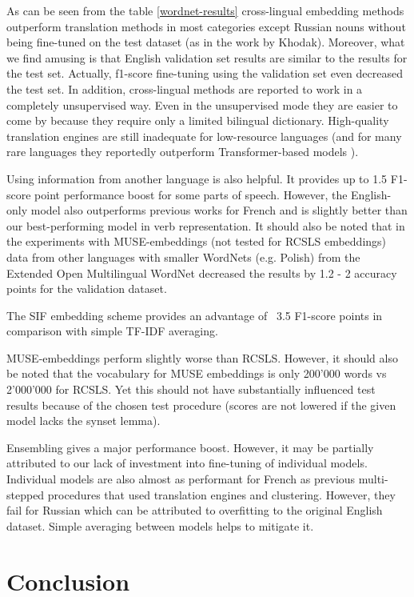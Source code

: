 \documentclass[conference]{IEEEtran}
\begin{document}
	As can be seen from the table \ref{wordnet-results} cross-lingual embedding methods outperform translation methods in most categories except Russian nouns without being fine-tuned on the test dataset (as in the work by Khodak). Moreover, what we find amusing is that English validation set results are similar to the results for the test set. Actually, f1-score fine-tuning using the validation set even decreased the test set. In addition, cross-lingual methods are reported to work in a completely unsupervised way. Even in the unsupervised mode they are easier to come by because they require only a limited bilingual dictionary. High-quality translation engines are still inadequate for low-resource languages (and for many rare languages they reportedly outperform Transformer-based models \cite{laser}).
	
	Using information from another language is also helpful. It provides up to 1.5 F1-score point performance boost for some parts of speech. However, the English-only model also outperforms previous works for French and is slightly better than our best-performing model in verb representation. It should also be noted that in the experiments with MUSE-embeddings (not tested for RCSLS embeddings) data from other languages with smaller WordNets (e.g. Polish) from the Extended Open Multilingual WordNet decreased the results by 1.2 - 2 accuracy points for the validation dataset.
	
	The SIF embedding scheme provides an advantage of ~3.5 F1-score points in comparison with simple TF-IDF averaging.
	
	MUSE-embeddings perform slightly worse than RCSLS. However, it should also be noted that the vocabulary for MUSE embeddings is only 200'000 words vs ~ 2'000'000 for RCSLS. Yet this should not have substantially influenced test results because of the chosen test procedure (scores are not lowered if the given model lacks the synset lemma).
	
	Ensembling gives a major performance boost. However, it may be partially attributed to our lack of investment into fine-tuning of individual models. Individual models are also almost as performant for French as previous multi-stepped procedures that used translation engines and clustering. However, they fail for Russian which can be attributed to overfitting to the original English dataset. Simple averaging between models helps to mitigate it.
	
	\section{Conclusion}
	
\end{document}
